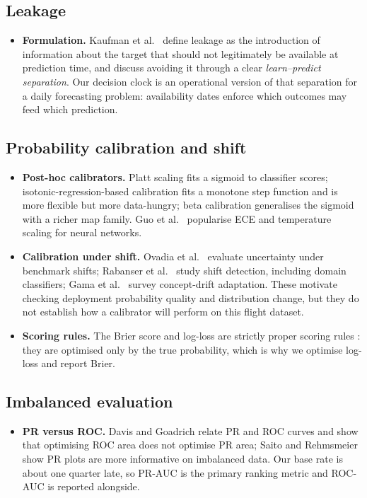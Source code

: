 \documentclass[conference]{IEEEtran}
\begin{document}
\subsection{Leakage}
\begin{itemize}
\item \textbf{Formulation.} Kaufman et al.\ \cite{kaufman2012leakage} define leakage as the introduction of information about the target that should not legitimately be available at prediction time, and discuss avoiding it through a clear \emph{learn--predict separation}. Our decision clock is an operational version of that separation for a daily forecasting problem: availability dates enforce which outcomes may feed which prediction.
\end{itemize}

\subsection{Probability calibration and shift}
\begin{itemize}
\item \textbf{Post-hoc calibrators.} Platt scaling \cite{platt1999} fits a sigmoid to classifier scores; isotonic-regression-based calibration \cite{zadrozny2002,niculescu2005} fits a monotone step function and is more flexible but more data-hungry; beta calibration \cite{kull2017beta} generalises the sigmoid with a richer map family. Guo et al.\ \cite{guo2017calibration} popularise ECE and temperature scaling for neural networks.
\item \textbf{Calibration under shift.} Ovadia et al.\ \cite{ovadia2019shift} evaluate uncertainty under benchmark shifts; Rabanser et al.\ \cite{rabanser2019failing} study shift detection, including domain classifiers; Gama et al.\ \cite{gama2014drift} survey concept-drift adaptation. These motivate checking deployment probability quality and distribution change, but they do not establish how a calibrator will perform on this flight dataset.
\item \textbf{Scoring rules.} The Brier score \cite{brier1950} and log-loss are strictly proper scoring rules \cite{gneiting2007scoring}: they are optimised only by the true probability, which is why we optimise log-loss and report Brier.
\end{itemize}

\subsection{Imbalanced evaluation}
\begin{itemize}
\item \textbf{PR versus ROC.} Davis and Goadrich \cite{davis2006pr} relate PR and ROC curves and show that optimising ROC area does not optimise PR area; Saito and Rehmsmeier \cite{saito2015pr} show PR plots are more informative on imbalanced data. Our base rate is about one quarter late, so PR-AUC is the primary ranking metric and ROC-AUC is reported alongside.
\end{itemize}
\end{document}
